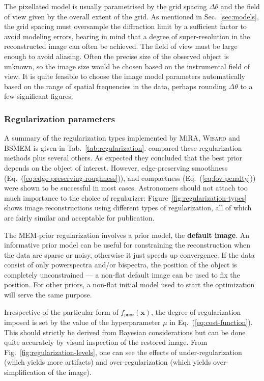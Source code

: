 \documentclass{article}
\newcommand{\vocab}[1]{\textbf{#1}}
\newcommand{\Tag}[1]{\mathsf{#1}}        %
\newcommand{\V}[1]{\boldsymbol{#1}}      %
\newcommand{\Eq}[1]{Eq.~(\ref{#1})}
\newcommand{\Fig}[1]{Fig.~\ref{#1}}
\newcommand{\Tab}[1]{Tab.~\ref{#1}}
\newcommand{\Dirn}{\theta}            %
\newcommand{\Param}{x}
\newcommand{\VParam}{\V{\Param}}
\newcommand{\PriorTag}{\Tag{prior}}
\newcommand{\Fcost}{f}
\newcommand{\Fprior}{\Fcost_\PriorTag}
\newcommand{\Mira}{MiRA\xspace}
\newcommand{\BSMEM}{BSMEM\xspace}
\newcommand{\Wisard}{\textsc{Wisard}\xspace}
\begin{document}
The pixellated model is usually parametrised by the grid spacing $\Delta\Dirn$
and the field of view given by the overall extent of the grid. As mentioned in
Sec.~\ref{sec:models}, the grid spacing must oversample the diffraction limit
by a sufficient factor to avoid modeling errors, bearing in mind that a degree
of super-resolution in the reconstructed image can often be achieved. The
field of view must be large enough to avoid aliasing. Often the precise size
of the observed object is unknown, so the image size would be chosen based on
the instrumental field of view. It is quite feasible to choose the image model
parameters automatically based on the range of spatial frequencies in the data,
perhaps rounding $\Delta\Dirn$ to a few significant figures.

\subsubsection{Regularization parameters}

A summary of the regularization types implemented by \Mira, \Wisard and \BSMEM
is given in \Tab{tab:regularization}. \citet{Renard-2011-regularization}
compared these regularization methods plus several others. As expected they
concluded that the best prior depends on the object of interest.  However,
edge-preserving smoothness (\Eq{eq:edge-preserving-roughness}), and
compactness (\Eq{eq:fov-penalty}) were shown to be successful in most
cases. Astronomers should not attach too much importance to the choice of
regularizer: Figure~\ref{fig:regularization-types} shows image reconstructions
using different types of regularization, all of which are fairly similar and
acceptable for publication.

The MEM-prior regularization involves a prior model, the \vocab{default
  image}. An informative prior model can be useful for constraining the
reconstruction when the data are sparse or noisy, otherwise it just speeds up
convergence. If the data consist of only powerspectra and/or bispectra, the
position of the object is completely unconstrained --- a non-flat default
image can be used to fix the position. For other priors, a non-flat initial
model used to start the optimization will serve the same purpose.

Irrespective of the particular form of $\Fprior(\VParam)$, the degree of
regularization imposed is set by the value of the hyperparameter $\mu$ in
\Eq{eq:cost-function}. This should strictly be derived from Bayesian
considerations but can be done quite accurately by visual inspection of the
restored image.  From \Fig{fig:regularization-levels}, one can see the effects
of under-regularization (which yields more artifacts) and over-regularization
(which yields over-simplification of the image).
\end{document}
